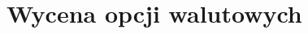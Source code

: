\documentclass{pracamgr}
\begin{document}

















\chapter{Wycena opcji walutowych}\label{r:sp}
\end{document}
